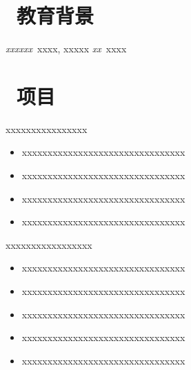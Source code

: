 \documentclass{resume}
\begin{document}


 
\section{\faGraduationCap\  教育背景}
\textit{xxxxxx}\ xxxx, xxxxx 
\textit{xx}\ xxxx 

\bigbreak

\section{\faHistory\ 项目}

\begin{onehalfspacing}
xxxxxxxxxxxxxxxx
\begin{itemize}
  \item xxxxxxxxxxxxxxxxxxxxxxxxxxxxxxxx
  \item xxxxxxxxxxxxxxxxxxxxxxxxxxxxxxxx
  \item xxxxxxxxxxxxxxxxxxxxxxxxxxxxxxxx
  \item xxxxxxxxxxxxxxxxxxxxxxxxxxxxxxxx
\end{itemize}
\end{onehalfspacing}

\begin{onehalfspacing}
xxxxxxxxxxxxxxxxx
\begin{itemize}
  \item xxxxxxxxxxxxxxxxxxxxxxxxxxxxxxxx
  \item xxxxxxxxxxxxxxxxxxxxxxxxxxxxxxxx
  \item xxxxxxxxxxxxxxxxxxxxxxxxxxxxxxxx
  \item xxxxxxxxxxxxxxxxxxxxxxxxxxxxxxxx
  \item xxxxxxxxxxxxxxxxxxxxxxxxxxxxxxxx
\end{itemize}
\end{onehalfspacing}
\end{document}
